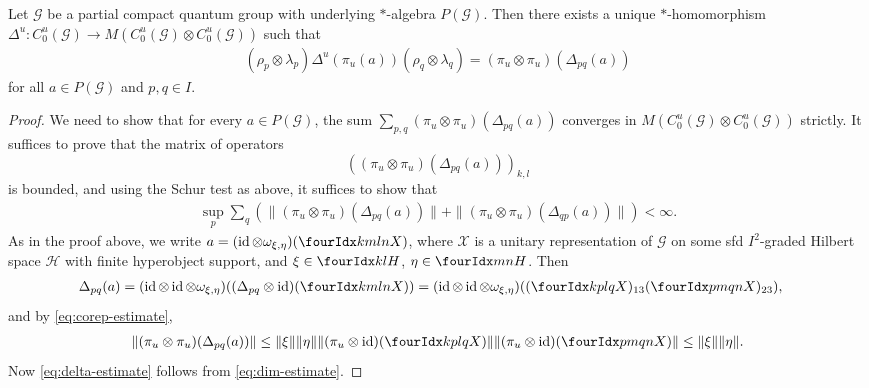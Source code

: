 \begin{Prop}
Let $\mathscr{G}$ be a partial compact quantum group with underlying
$*$-algebra $P(\mathscr{G})$. Then  there exists a unique $*$-homomorphism $\Delta^{u}\colon
  C^{u}_{0}(\mathscr{G}) \to M(C^{u}_{0}(\mathscr{G}) \otimes
  C^{u}_{0}(\mathscr{G}))$ such that 
  \begin{align*}
    (\rho_{p} \otimes
    \lambda_{p})\Delta^{u}(\pi_{u}(a))(\rho_{q}\otimes \lambda_{q}) =
    (\pi_{u} \otimes \pi_{u})(\Delta_{pq}(a))
  \end{align*}
  for all $a \in P(\mathscr{G})$ and $p,q\in I$.
\end{Prop}
\begin{proof}
  We need to show that for every $a \in P(\mathscr{G})$, the sum
  $\sum_{p,q} (\pi_{u} \otimes \pi_{u})(\Delta_{pq}(a))$ converges in $M(C^{u}_{0}(\mathscr{G})
  \otimes C^{u}_{0}(\mathscr{G}))$ strictly.  It suffices to prove
  that the matrix of operators 
\[\left((\pi_{u} \otimes
    \pi_{u})(\Delta_{pq}(a))\right)_{k,l}\] is bounded, and using the Schur test as above, it
  suffices to show that
  \begin{align} \label{eq:delta-estimate}
    \sup_{p} \sum_{q} (\|(\pi_{u} \otimes \pi_{u})(\Delta_{pq}(a))\| + \|(\pi_{u} \otimes \pi_{u})(\Delta_{qp}(a))\|) < \infty.
  \end{align}
  As in the proof above, we write
  $a=(\id \otimes \omega_{\xi,\eta})(\Gr{X}{k}{l}{m}{n})$, where $\mathscr{X}$ is a unitary
 representation of $\mathscr{G}$  on some sfd $I^{2}$-graded
  Hilbert space $\mathcal{H}$ with finite hyperobject support, and
  $\xi\in \Gru{H}{k}{l}$, $\eta\in \Gru{H}{m}{n}$. Then
  \begin{align*}
    \Delta_{pq}(a) &= (\id \otimes \id \otimes \omega_{\xi,\eta})((\Delta_{pq} \otimes
    \id)(\Gr{X}{k}{l}{m}{n})) =
    (\id \otimes \id \otimes \omega_{\xi,\eta})((\Gr{X}{k}{l}{p}{q})_{13}(\Gr{X}{p}{q}{m}{n})_{23}),
  \end{align*}
and by \eqref{eq:corep-estimate},
\begin{align*}
  \|(\pi_{u} \otimes \pi_{u})(\Delta_{pq}(a))\| \leq \|\xi\|\|\eta\| \|(\pi_{u} \otimes \id)(\Gr{X}{k}{l}{p}{q})\|
  \|(\pi_{u} \otimes \id)(\Gr{X}{p}{q}{m}{n})\|  \leq \|\xi\|\|\eta\|.
\end{align*}
Now \eqref{eq:delta-estimate} follows from \eqref{eq:dim-estimate}.
\end{proof}



